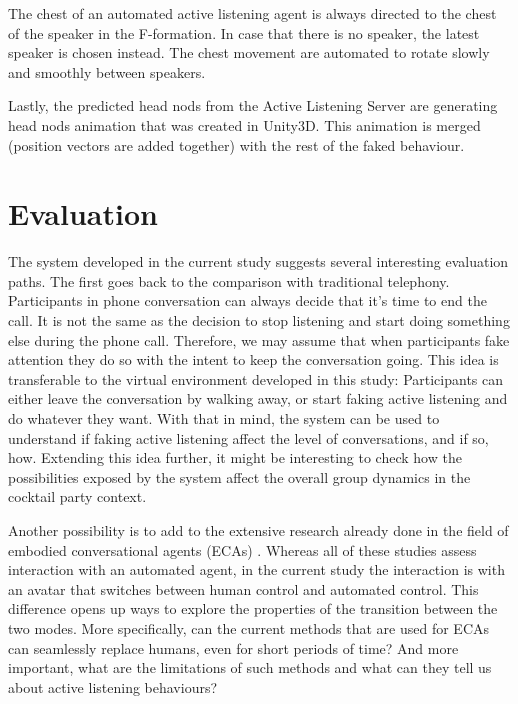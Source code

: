 \documentclass[]{simple-thesis}
\begin{document}
The chest of an automated active listening agent is always directed to the chest of the speaker in the F-formation.
In case that there is no speaker, the latest speaker is chosen instead.
The chest movement are automated to rotate slowly and smoothly between speakers.

Lastly, the predicted head nods from the Active Listening Server are generating head nods animation that was created in Unity3D.
This animation is merged (position vectors are added together) with the rest of the faked behaviour.


\chapter{Evaluation}\label{evaluation}

The system developed in the current study suggests several interesting evaluation paths.
The first goes back to the comparison with traditional telephony.
Participants in phone conversation can always decide that it's time to end the call.
It is not the same as the decision to stop listening and start doing something else during the phone call.
Therefore, we may assume that when participants fake attention they do so with the intent to keep the conversation going.
This idea is transferable to the virtual environment developed in this study:
Participants can either leave the conversation by walking away, or start faking active listening and do whatever they want.
With that in mind, the system can be used to understand if faking active listening affect the level of conversations, and if so, how.
Extending this idea further, it might be interesting to check how the possibilities exposed by the system affect the overall group dynamics in the cocktail party context.

Another possibility is to add to the extensive research already done in the field of embodied conversational agents (ECAs) \citep{Nishimura2007, Bevacqua2008, Gratch2007, Huang2011, Lee2006}.
Whereas all of these studies assess interaction with an automated agent, in the current study the interaction is with an avatar that switches between human control and automated control.
This difference opens up ways to explore the properties of the transition between the two modes.
More specifically, can the current methods that are used for ECAs can seamlessly replace humans, even for short periods of time?
And more important, what are the limitations of such methods and what can they tell us about active listening behaviours?
\end{document}
